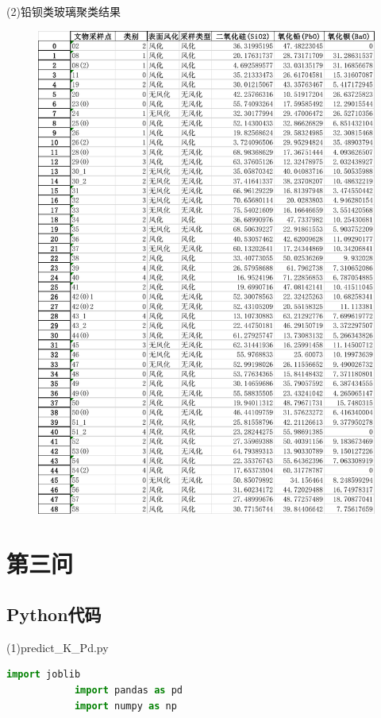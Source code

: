 \documentclass[withoutpreface,bwprint]{cumcmthesis}
\begin{document}
\begin{appendices}
		(2)铅钡类玻璃聚类结果

		\begin{figure}[H]
			\centering
			\includegraphics[scale=0.7]{铅钡类聚类}
		\end{figure}

		\section{第三问}

		\subsection{Python代码}

		(1)predict\_K\_Pd.py 
		\begin{lstlisting}[language=Python]
			import joblib
			import pandas as pd
			import numpy as np
			

\end{lstlisting}
\end{appendices}
\end{document}
